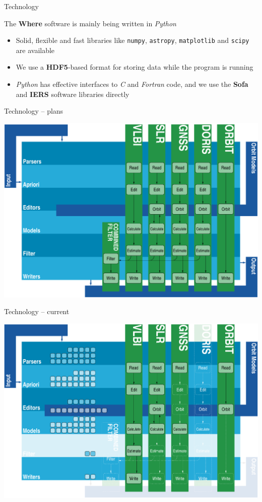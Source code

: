 \documentclass[ignorenonframetext,12pt,t]{beamer}
\begin{document}
\begin{frame}[fragile]{Technology}

The \textbf{Where} software is mainly being written in \emph{Python}

\begin{itemize}
\item
  Solid, flexible and fast libraries like \texttt{numpy},
  \texttt{astropy}, \texttt{matplotlib} and \texttt{scipy} are available
\item
  We use a \textbf{HDF5}-based format for storing data while the program
  is running
\item
  \emph{Python} has effective interfaces to \emph{C} and \emph{Fortran}
  code, and we use the \textbf{Sofa} and \textbf{IERS} software
  libraries directly
\end{itemize}

\end{frame}

\begin{frame}{Technology -- plans}

\centering
\includegraphics{figure/code_structure}

\end{frame}

\begin{frame}{Technology -- current}

\centering
\includegraphics{figure/code_structure_current}

\end{frame}
\end{document}
